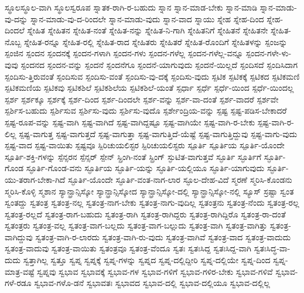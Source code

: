 {ಸ್ಥೂಲಸ್ಥೂಲ-ವಾಗಿ
ಸ್ಥೂಲಸ್ವರೂಪ
ಸ್ನಾತಕ-ರಾಗಿ-ರ-ಬಹುದು
ಸ್ನಾನ
ಸ್ನಾನ-ಮಾಡ-ಬೇಕು
ಸ್ನಾನ-ಮಾಡಿ
ಸ್ನಾನ-ಮಾಡು-ವು-ದನ್ನು
ಸ್ನಾನ-ಮಾಡು-ವು-ದ-ರಿಂದಲೇ
ಸ್ನಾನ-ಮಾಡು-ವುದು
ಸ್ನಾನ-ವಾದ
ಸ್ನಾಯು
ಸ್ನೇಹ
ಸ್ನೇಹ-ದಿಂದ
ಸ್ನೇಹ-ದಿಂದಲೆ
ಸ್ನೇಹಿತ
ಸ್ನೇಹಿತನ
ಸ್ನೇಹಿತ-ನಂತೆ
ಸ್ನೇಹಿತ-ನನ್ನು
ಸ್ನೇಹಿತ-ನಿ-ಗಾಗಿ
ಸ್ನೇಹಿತನಿಗೆ
ಸ್ನೇಹಿತನೆ
ಸ್ನೇಹಿತನೇ
ಸ್ನೇಹಿತ-ನೊಬ್ಬ
ಸ್ನೇಹಿತ-ರನ್ನೂ
ಸ್ನೇಹಿತ-ರಲ್ಲಿ
ಸ್ನೇಹಿತ-ರಾದ
ಸ್ನೇಹಿತರು
ಸ್ನೇಹಿತರೆ
ಸ್ನೇಹಿತ-ರೊಂದಿಗೆ
ಸ್ನೇಹಿತಳನ್ನು
ಸ್ಪಂಜನ್ನು
ಸ್ಪಂಜಿನ
ಸ್ಪಂದನ
ಸ್ಪಂದನಕ್ಕೆ
ಸ್ಪಂದನ-ಗಳಾಗಿ
ಸ್ಪಂದನ-ಗಳು
ಸ್ಪಂದನ-ಗಳೆಲ್ಲ
ಸ್ಪಂದನ-ಗಳೆಲ್ಲ-ವನ್ನೂ
ಸ್ಪಂದನ-ಗಳೇ-ಳು-ವುವು
ಸ್ಪಂದನದ
ಸ್ಪಂದನ-ವನ್ನು
ಸ್ಪಂದನೆ
ಸ್ಪಂದನೆಗೂ
ಸ್ಪಂದನೆ-ಯಾಗುವುದು
ಸ್ಪಂದನೆ-ಯಿಲ್ಲದೆ
ಸ್ಪಂದಿಸದೆ
ಸ್ಪಂದಿಸಿದಾಗ
ಸ್ಪಂದಿಸು-ತ್ತಿರುವಂತೆ
ಸ್ಪಂದಿಸುವ
ಸ್ಪಂದಿಸು-ವಂತೆ
ಸ್ಪಂದಿಸು-ವು-ದಕ್ಕೆ
ಸ್ಪಂದಿಸು-ವುದು
ಸ್ಪಟಿಕ
ಸ್ಪಟಿಕಕ್ಕೆ
ಸ್ಪಟಿಕದ
ಸ್ಪಟಿಕಮಣಿ
ಸ್ಪಟಿಕಮಣಿಯ
ಸ್ಪಟಿಕವು
ಸ್ಪಟಿಕಶಿಲೆ
ಸ್ಪಟಿಕಶಿಲೆಯ
ಸ್ಪಟಿಕಶಿಲೆ-ಯಂತೆ
ಸ್ಪರ್ಧಾ
ಸ್ಪರ್ಧೆ
ಸ್ಪರ್ಧೆ-ಯಿಂದ
ಸ್ಪರ್ಧೆ-ಯಿಂದಲ್ಲ
ಸ್ಪರ್ಶ
ಸ್ಪರ್ಶಕ್ಕೂ
ಸ್ಪರ್ಶಕ್ಕೆ
ಸ್ಪರ್ಶ-ದಿಂದ
ಸ್ಪರ್ಶ-ದಿಂದಲೇ
ಸ್ಪರ್ಶ-ವನ್ನು
ಸ್ಪರ್ಶ-ವಾ-ದಂತೆ
ಸ್ಪರ್ಶ-ವಾದರೆ
ಸ್ಪರ್ಶವೇ
ಸ್ಪರ್ಶಿಸ-ಬಹುದು
ಸ್ಪರ್ಶಿಸುವ
ಸ್ಪರ್ಶಿಸು-ವುದು
ಸ್ಪರ್ಶಿಸು-ವುದೊ
ಸ್ಪರ್ಶೇಂದ್ರಿಯ-ವನ್ನು
ಸ್ಪಷ್ಟ
ಸ್ಪಷ್ಟ-ಪಡಿಸ-ಬೇಕಾದರೆ
ಸ್ಪಷ್ಟ-ರೂಪ-ವನ್ನು
ಸ್ಪಷ್ಟ-ವಾಗಿ
ಸ್ಪಷ್ಟ-ವಾಗಿದೆ
ಸ್ಪಷ್ಟ-ವಾಗಿದ್ದಷ್ಟೂ
ಸ್ಪಷ್ಟ-ವಾಗಿಯೇ
ಸ್ಪಷ್ಟ-ವಾಗಿ-ರ-ಬೇಕು
ಸ್ಪಷ್ಟ-ವಾಗಿ-ರ-ಲಿಲ್ಲ
ಸ್ಪಷ್ಟ-ವಾಗುತ್ತ
ಸ್ಪಷ್ಟ-ವಾಗುತ್ತದೆ
ಸ್ಪಷ್ಟ-ವಾಗುತ್ತಾ
ಸ್ಪಷ್ಟ-ವಾಗುತ್ತಿದೆ-ಯೆಷ್ಟೆ
ಸ್ಪಷ್ಟ-ವಾಗುತ್ತಿದ್ದುವು
ಸ್ಪಷ್ಟ-ವಾಗು-ವುದು
ಸ್ಪಷ್ಟ-ವಾದ
ಸ್ಪಷ್ಟ-ವಾಯಿತು
ಸ್ಪಷ್ಟವೂ
ಸ್ಪಿರಿಚುಯಲಿಸ್ಟರ
ಸ್ಪಿರಿಚುಯಲಿಸ್ಟರು
ಸ್ಪೂರ್ತಿ
ಸ್ಪೂರ್ತಿಯ
ಸ್ಪೂರ್ತಿ-ಯೊಂದೇ
ಸ್ಪೂರ್ತಿ-ಶಕ್ತಿ-ಗಳನ್ನು
ಸ್ಪೆನ್ಸರನ
ಸ್ಪೆನ್ಸರ್
ಸ್ಪೇನ್
ಸ್ಪ್ರಿಂಗಿ-ನಂತೆ
ಸ್ಪ್ರಿಂಗ್
ಸ್ಫುಟಿತ-ವಾಗುತ್ತವೆ
ಸ್ಫೂರ್ತಿ
ಸ್ಫೂರ್ತಿಗೆ
ಸ್ಫೂರ್ತಿ-ಗೊಂಡ
ಸ್ಫೂರ್ತಿ-ಗೊಂಡ-ವನು
ಸ್ಫೂರ್ತಿಯ
ಸ್ಫೂರ್ತಿ-ಯನ್ನು
ಸ್ಫೂರ್ತಿ-ಯಲ್ಲಿಯೂ
ಸ್ಫೂರ್ತಿ-ಯಾಗುವುದು
ಸ್ಫೂರ್ತಿ-ಯು-ತರಾಗ-ಬೇಕಾ-ಗಿದೆ
ಸ್ಫೂರ್ತಿ-ಯೊಂದೇ
ಸ್ಫೂರ್ತಿ-ವಂತ-ನಾಗ-ಲಾರ
ಸ್ಫೂಲ-ದೇಹ-ವಿದೆ
ಸ್ಮರಣೆ
ಸ್ಮರಿಸಿ-ಕೊಂಡನು
ಸ್ಮರಿಸಿ-ಕೊಳ್ಳಿ
ಸ್ಮಶಾನ
ಸ್ಯಾನ್ಫ್ರಾನ್ಸಿಸ್ಕೋ
ಸ್ಯಾನ್ಫ್ರಾನ್ಸಿಸ್ಕೋದ
ಸ್ಯಾನ್ಫ್ರಾನ್ಸಿಸ್ಕೋ-ದಲ್ಲಿ
ಸ್ಯಾನ್ಫ್ರಾನ್ಸಿಸ್ಕೋ-ನಲ್ಲಿ
ಸ್ಯೂಸ್
ಸ್ರಷ್ಟಾ
ಸ್ವಂತ
ಸ್ವಂತದ್ದು
ಸ್ವತಂತ್ರ
ಸ್ವತಂತ್ರ-ನಲ್ಲ
ಸ್ವತಂತ್ರ-ನಾಗ-ಬೇಕು
ಸ್ವತಂತ್ರ-ನಾಗು-ವುದಿಲ್ಲ
ಸ್ವತಂತ್ರನು
ಸ್ವತಂತ್ರ-ನೆಂದು
ಸ್ವತಂತ್ರ-ರಲ್ಲ
ಸ್ವತಂತ್ರ-ರಲ್ಲದೆ
ಸ್ವತಂತ್ರ-ರಾಗ-ಬಹುದು
ಸ್ವತಂತ್ರ-ರಾಗಿ
ಸ್ವತಂತ್ರ-ರಾಗಿದ್ದರು
ಸ್ವತಂತ್ರ-ರಾಗಿದ್ದಿರೊ
ಸ್ವತಂತ್ರ-ರಾ-ದಂತೆ
ಸ್ವತಂತ್ರರು
ಸ್ವತಂತ್ರ-ವಲ್ಲ
ಸ್ವತಂತ್ರ-ವಾಗ-ಬಲ್ಲದು
ಸ್ವತಂತ್ರ-ವಾಗ-ಬಲ್ಲುದು
ಸ್ವತಂತ್ರ-ವಾಗಿ
ಸ್ವತಂತ್ರ-ವಾಗಿತ್ತು
ಸ್ವತಂತ್ರ-ವಾಗಿದ್ದುವು
ಸ್ವತಂತ್ರ-ವಾಗಿ-ರ-ಲಾರದು
ಸ್ವತಂತ್ರ-ವಾಗಿ-ರು-ವುದು
ಸ್ವತಂತ್ರ-ವಾಗಿವೆ
ಸ್ವತಂತ್ರ-ವಾದ
ಸ್ವತಂತ್ರ-ವಾದುದು
ಸ್ವತಂತ್ರ-ವಾದುವು
ಸ್ವತಂತ್ರ-ವಾಯಿತು
ಸ್ವತಂತ್ರವೂ
ಸ್ವತಂತ್ರ-ವೆಂದೂ
ಸ್ವತಃ
ಸ್ವತಃಸಿದ್ದ
ಸ್ವತಃಸಿದ್ದ-ವಾಗಿ
ಸ್ವತಃಸಿದ್ಧ-ವಾ-ದುದು
ಸ್ವತ್ತಾಗಿಲ್ಲ
ಸ್ವತ್ತೂ
ಸ್ವಪ್ನ
ಸ್ವಪ್ನಕ್ಕೆ
ಸ್ವಪ್ನ-ಗಳನ್ನು
ಸ್ವಪ್ನದ
ಸ್ವಪ್ನ-ದಲ್ಲಿದ್ದೀರಿ
ಸ್ವಪ್ನ-ದಲ್ಲಿಯೇ
ಸ್ವಪ್ನ-ದಿಂದ
ಸ್ವಪ್ನ-ಮಾತ್ರ-ವಷ್ಟೆ
ಸ್ವಪ್ನವು
ಸ್ವಭಾವ
ಸ್ವಭಾವಕ್ಕೆ
ಸ್ವಭಾವ-ಗಳ
ಸ್ವಭಾವ-ಗಳಿಗೆ
ಸ್ವಭಾವ-ಗಳಿರ-ಬೇಕು
ಸ್ವಭಾವ-ಗಳಿವೆ
ಸ್ವಭಾವ-ಗಳೆ-ರಡೂ
ಸ್ವಭಾವ-ಗಳೊ-ಡನೆ
ಸ್ವಭಾವತಃ
ಸ್ವಭಾವದ
ಸ್ವಭಾವ-ದಲ್ಲಿ
ಸ್ವಭಾವ-ದಲ್ಲಿಯೂ
ಸ್ವಭಾವ-ದಲ್ಲಿಲ್ಲ
}
